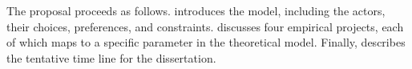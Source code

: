 The proposal proceeds as follows.  introduces the model, including the actors, their choices, preferences, and constraints.  discusses four empirical projects, each of which maps to a specific parameter in the theoretical model. Finally,  describes the tentative time line for the dissertation.